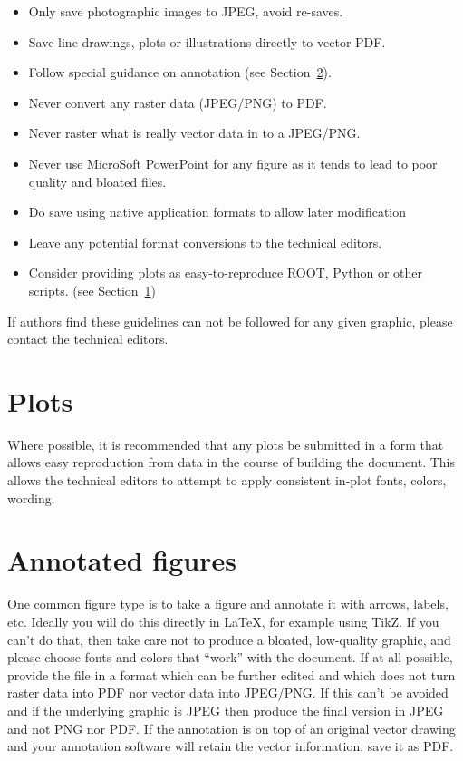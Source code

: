 \begin{itemize}
\item Only save photographic images to JPEG, avoid re-saves.
\item Save line drawings, plots or illustrations directly to vector PDF.
\item Follow special guidance on annotation (see Section~\ref{sec:graphic-annotate}).
\item Never convert any raster data (JPEG/PNG) to PDF.
\item Never raster what is really vector data in to a JPEG/PNG.
\item Never use MicroSoft PowerPoint for any figure as it tends to lead to poor quality and bloated files.
\item Do save using native application formats to allow later
  modification
\item Leave any potential format conversions to the technical editors.
\item Consider providing plots as easy-to-reproduce ROOT, Python or
  other scripts.
  (see Section~\ref{sec:graphic-plots})
\end{itemize}

\noindent If authors find these guidelines can not be followed for any
given graphic, please contact the technical editors.   

\section{Plots}
\label{sec:graphic-plots}

Where possible, it is recommended that any plots be submitted in a
form that allows easy reproduction from data in the course of building
the document.
This allows the technical editors to attempt to apply consistent
in-plot fonts, colors, wording.

\section{Annotated figures}
\label{sec:graphic-annotate}

One common figure type is to take a figure and annotate it with
arrows, labels, etc.
Ideally you will do this directly in \LaTeX{}, for example using TikZ.
If you can't do that, then take care not to produce a bloated,
low-quality graphic, and please choose fonts and colors that ``work''
with the document.
If at all possible, provide the file in a format which can be further
edited and which does not turn raster data into PDF nor vector data
into JPEG/PNG.
If this can't be avoided and if the underlying graphic is JPEG then
produce the final version in JPEG and not PNG nor PDF.
If the annotation is on top of an original vector drawing and your
annotation software will retain the vector information, save it as
PDF.

